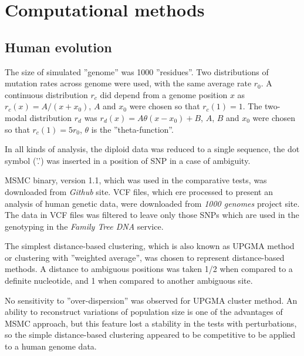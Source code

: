 \documentclass[12pt,aps]{revtex4}
\begin{document}

\section{Computational methods}

\subsection{Human evolution}

The size of simulated ''genome'' was 1000 ''residues''. Two distributions of mutation rates across genome were used, with the same average rate $r_0$. A continuous distribution $r_c$ did depend from a genome position $x$ as $r_c(x) = A / ( x + x_0 )$, $A$ and $x_0$ were chosen so that $r_c(1) = 1$. The two-modal distribution $r_d$ was $r_d(x) = A \theta( x - x_0 ) + B$,  $A$, $B$ and $x_0$ were chosen so that $r_c(1) = 5 r_0$, $\theta$ is the ''theta-function''. 

In all kinds of analysis, the diploid data was reduced to a single sequence, the dot symbol ('.') was inserted in a position of SNP in a case of ambiguity.

MSMC binary, version 1.1, which was used in the comparative tests, was downloaded from \textit{Github} site. VCF files, which ere processed to present an analysis of human genetic data, were downloaded from \textit{1000 genomes} project site. The data in VCF files was filtered to leave only those SNPs which are used in the genotyping in the \textit{Family Tree DNA} service.

The simplest distance-based clustering, which is also known as UPGMA method or clustering with ''weighted average'', was chosen to represent distance-based methods. A distance to ambiguous positions was taken 1/2 when compared to a definite nucleotide, and 1 when compared to another ambiguous site. 

No sensitivity to ''over-dispersion'' was observed for UPGMA cluster method. An ability to reconstruct variations of population size is one of the advantages of MSMC approach, but this feature lost a stability in the tests with perturbations, so the simple distance-based clustering appeared to be competitive to be applied to a human genome data.
\end{document}
